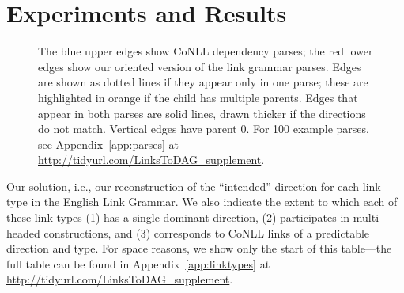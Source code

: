 \documentclass[11pt]{article}
\begin{document}
% 
%   




\section{Experiments and Results}

\begin{figure}[ht!]
  \vspace{-6pt}
  \centering
  
  
  \caption{\small The blue upper edges show CoNLL dependency parses; the red lower edges show our oriented version of the link grammar parses. Edges are shown as dotted lines if they appear only in one parse; these are highlighted in orange if the child has multiple parents.  Edges that appear in both parses are solid lines, drawn thicker if the directions do not match.  Vertical edges have parent 0.  For 100 example parses, see Appendix~\ref{app:parses} at \url{http://tidyurl.com/LinksToDAG_supplement}.}
  \label{fig:parses}
  \vspace{-6pt}
\end{figure}

\begin{table}[ht]

\caption{Our solution, i.e., our reconstruction of the ``intended'' direction for each link type in the English Link Grammar.  We also indicate the extent to which each of these link types (1) has a single dominant direction, (2) participates in multi-headed constructions, and (3) corresponds to CoNLL links of a predictable direction and type.  For space reasons, we show only the start of this table---the full table can be found in Appendix~\ref{app:linktypes} at \url{http://tidyurl.com/LinksToDAG_supplement}.}\label{tab:linktypes}
\end{table}
\end{document}

